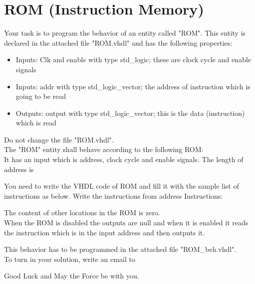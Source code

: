 \documentclass[a4paper,12pt]{article}
\begin{document}
\pagestyle{empty}
\setlength{\parindent}{0em} 
\section*{ROM (Instruction Memory)}


Your task is to program the behavior of an entity called "ROM". This entity is declared in the attached file "ROM.vhdl" and has the following properties:
\begin{itemize}
\item Inputs: Clk and enable with type std\_logic; these are clock cycle and enable signals
\item Inputs: addr with type std\_logic\_vector; the address of instruction which is going to be read
\item Outputs: output with type std\_logic\_vector; this is the data (instruction) which is read 
\end{itemize}
\vspace{0.3cm}

Do not change the file "ROM.vhdl".\\

The "ROM" entity shall behave according to the following ROM:\\

It has an input which is address, clock cycle and enable signals. The length of address is %

You need to write the VHDL code of ROM and fill it with the sample list of instructions as below. Write the instructions from address %
Instructions:
\begin{center}
\end{center}

The content of other locations in the ROM is zero.
\\

When the ROM is disabled the outputs are null and when it is enabled it reads the instruction which is in the input address and then outputs it. 

This behavior has to be programmed in the attached file "ROM\_beh.vhdl".\\

To turn in your solution, write an email to %

\vspace{0.7cm}

Good Luck and May the Force be with you.
\end{document}
